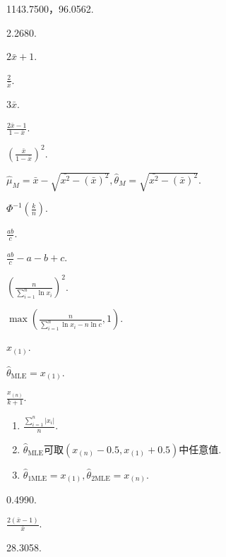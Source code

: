\begin{answer}
  \item 1143.7500，96.0562.
  \item 2.2680.
  \item \begin{enumerate*}
    \item $2\bar x+1$.
    \item $\frac2{\bar x}$.
  \end{enumerate*}
  \item \begin{enumerate*}
    \item $3\bar x$.
    \item $\frac{2\bar x-1}{1-\bar x}$.
    \item $\left( \frac{\bar x}{1-\bar x} \right)^2$.
    \item $\hat\mu_M=\bar x-\sqrt{\bar{x^2}-(\bar x)^2},
    \hat\theta_M=\sqrt{\bar{x^2}-(\bar x)^2}$.
  \end{enumerate*}
  \item $\varPhi^{-1}\left(\frac kn\right)$.
  \item \begin{enumerate*}
    \item $\frac{ab}c$.
    \item $\frac{ab}c-a-b+c$.
  \end{enumerate*}
  \item \begin{enumerate*}
    \item $\left(\frac n{\sum_{i=1}^n\ln x_i}\right)^2$.
    \item $\max\left( \frac n{\sum_{i=1}^n\ln x_i-n\ln c},1 \right)$.
  \end{enumerate*}
  \item \begin{enumerate*}
    \item $x_{(1)}$.
    \item $\hat\theta_{\text{MLE}}=x_{(1)}$.
    \item $\frac{x_{(n)}}{k+1}$.
  \end{enumerate*}
  \item \begin{enumerate}
    \item $\frac{\sum_{i=1}^n|x_i|}n$.
    \item $\hat\theta_{\text{MLE}}$可取$(x_{(n)}-0.5,x_{(1)}+0.5)$中任意值.
    \item $\hat\theta_{1\text{MLE}}=x_{(1)},
    \hat\theta_{2\text{MLE}}=x_{(n)}$.
  \end{enumerate}
  \item 0.4990.
  \item $\frac{2(\bar x-1)}{\bar x}$.
  \item 28.3058.
\end{answer}

